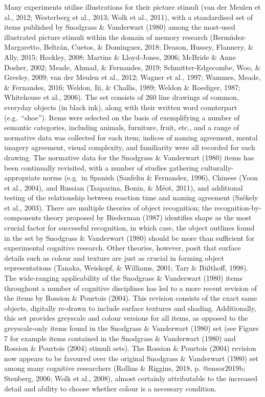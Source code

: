 \documentclass[
  11pt,
]{article}
\begin{document}
Many experiments utilise illustrations for their picture stimuli (van
der Meulen et al., 2012; Westerberg et al., 2013; Wolk et al., 2011),
with a standardised set of items published by Snodgrass \& Vanderwart
(1980) among the most-used illustrated picture stimuli within the domain
of memory research (Bermúdez-Margaretto, Beltrán, Cuetos, \& Domínguez,
2018; Deason, Hussey, Flannery, \& Ally, 2015; Hockley, 2008; Martins \&
Lloyd-Jones, 2006; McBride \& Anne Dosher, 2002; Meade, Ahmad, \&
Fernandes, 2019; Schmitter-Edgecombe, Woo, \& Greeley, 2009; van der
Meulen et al., 2012; Wagner et al., 1997; Wammes, Meade, \& Fernandes,
2016; Weldon, Iii, \& Challis, 1989; Weldon \& Roediger, 1987;
Whitehouse et al., 2006). The set consists of 260 line drawings of
common, everyday objects (in black ink), along with their written word
counterpart (e.g.~``shoe''). Items were selected on the basis of
exemplifying a number of semantic categories, including animals,
furniture, fruit, etc., and a range of normative data was collected for
each item; indices of naming agreement, mental imagery agreement, visual
complexity, and familiarity were all recorded for each drawing. The
normative data for the Snodgrass \& Vanderwart (1980) items has been
continually revisited, with a number of studies gathering
culturally-appropriate norms (e.g.~in Spanish (Sanfeliu \& Fernandez,
1996), Chinese (Yoon et al., 2004), and Russian (Tsaparina, Bonin, \&
Méot, 2011), and additional testing of the relationship between reaction
time and naming agreement (Székely et al., 2003). There are multiple
theories of object recognition; the recognition-by-components theory
proposed by Biederman (1987) identifies shape as the most crucial factor
for successful recognition, in which case, the object outlines found in
the set by Snodgrass \& Vanderwart (1980) should be more than sufficient
for experimental cognitive research. Other theories, however, posit that
surface details such as colour and texture are just as crucial in
forming object representations (Tanaka, Weiskopf, \& Williams, 2001;
Tarr \& Bülthoff, 1998). The wide-ranging applicability of the Snodgrass
\& Vanderwart (1980) items throughout a number of cognitive disciplines
has led to a more recent revision of the items by Rossion \& Pourtois
(2004). This revision consists of the exact same objects, digitally
re-drawn to include surface textures and shading. Additionally, this set
provides greyscale and colour versions for all items, as opposed to the
greyscale-only items found in the Snodgrass \& Vanderwart (1980) set
(see Figure 7 for example items contained in the Snodgrass \& Vanderwart
(1980) and Rossion \& Pourtois (2004) stimuli sets). The Rossion \&
Pourtois (2004) revision now appears to be favoured over the original
Snodgrass \& Vanderwart (1980) set among many cognitive researchers
(Rollins \& Riggins, 2018, p. @ensor2019b; Stenberg, 2006; Wolk et al.,
2008), almost certainly attributable to the increased detail and ability
to choose whether colour is a necessary condition.
\end{document}

